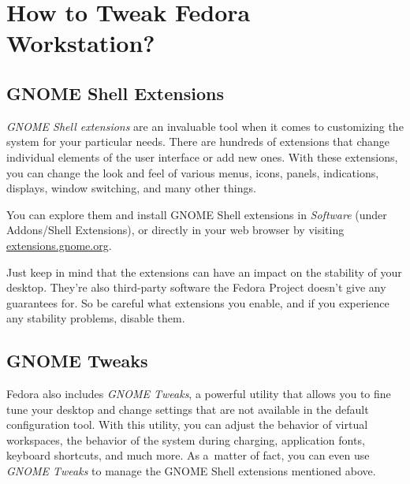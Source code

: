 \chapter*{How to Tweak Fedora Workstation?}
\section*{GNOME Shell Extensions}

\emph{GNOME Shell extensions} are an invaluable tool when it comes to customizing the system for your particular needs. There are hundreds of extensions that change individual elements of the user interface or add new ones. With these extensions, you can change the look and feel of various menus, icons, panels, indications, displays, window switching, and many other things.

You can explore them and install GNOME Shell extensions in \emph{Software} (under Addons/Shell Extensions), or directly in your web browser by visiting \url{extensions.gnome.org}.

Just keep in mind that the extensions can have an impact on the stability of your desktop. They're also third-party software the Fedora Project doesn't give any guarantees for. So be careful what extensions you enable, and if you experience any stability problems, disable them.

\section*{GNOME Tweaks}

Fedora also includes \emph{GNOME Tweaks}, a powerful utility that allows you to fine tune your desktop and change settings that are not available in the default configuration tool. With this utility, you can adjust the behavior of virtual workspaces, the behavior of the system during charging, application fonts, keyboard shortcuts, and much more. As a~matter of fact, you can even use \emph{GNOME Tweaks} to manage the GNOME Shell extensions mentioned above.
\endinput
